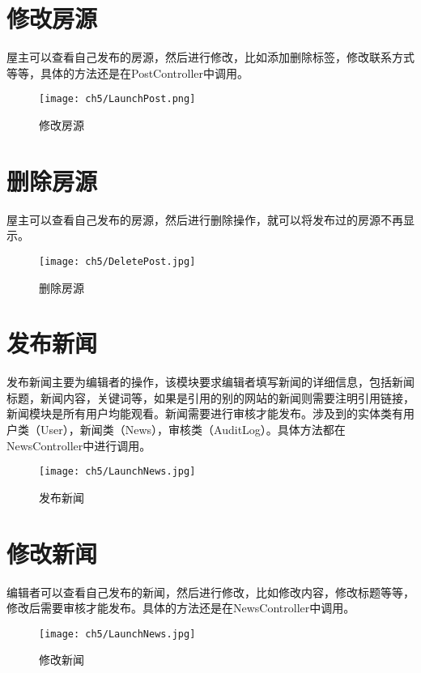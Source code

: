 \section{修改房源}
屋主可以查看自己发布的房源，然后进行修改，比如添加删除标签，修改联系方式等等，具体的方法还是在PostController中调用。
\begin{figure}[htbp]
    \centering
    \texttt{[image: ch5/LaunchPost.png]}
    \caption{修改房源}\label{fig:UpdatePost}
    \vspace{\baselineskip} %
\end{figure}
\section{删除房源}
屋主可以查看自己发布的房源，然后进行删除操作，就可以将发布过的房源不再显示。
\begin{figure}[htbp]
    \centering
    \texttt{[image: ch5/DeletePost.jpg]}
    \caption{删除房源}\label{fig:DeletePost}
    \vspace{\baselineskip} %
\end{figure}
\section{发布新闻}
发布新闻主要为编辑者的操作，该模块要求编辑者填写新闻的详细信息，包括新闻标题，新闻内容，关键词等，如果是引用的别的网站的新闻则需要注明引用链接，
新闻模块是所有用户均能观看。新闻需要进行审核才能发布。涉及到的实体类有用户类（User），新闻类（News），审核类（AuditLog）。具体方法都在NewsController中进行调用。
\begin{figure}[htbp]
    \centering
    \texttt{[image: ch5/LaunchNews.jpg]}
    \caption{发布新闻}\label{fig:LaunchNews}
    \vspace{\baselineskip} %
\end{figure}
\section{修改新闻}
编辑者可以查看自己发布的新闻，然后进行修改，比如修改内容，修改标题等等，修改后需要审核才能发布。具体的方法还是在NewsController中调用。
\begin{figure}[htbp]
    \centering
    \texttt{[image: ch5/LaunchNews.jpg]}
    \caption{修改新闻}\label{fig:UpdateNews}
    \vspace{\baselineskip} %
\end{figure}
